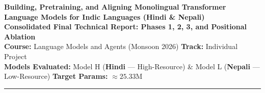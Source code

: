 \documentclass[10pt,a4paper]{article}
\begin{document}
\begin{center}
    {\Large \textbf{Building, Pretraining, and Aligning Monolingual Transformer Language Models for Indic Languages (Hindi \& Nepali)}}\\[4pt]
    {\normalsize \textbf{Consolidated Final Technical Report: Phases 1, 2, 3, and Positional Ablation}}\\[3pt]
    \small{\textbf{Course:} Language Models and Agents (Monsoon 2026) \quad \textbar \quad \textbf{Track:} Individual Project}\\[2pt]
    \footnotesize{\textbf{Models Evaluated:} Model H (\textbf{Hindi} --- High-Resource) \& Model L (\textbf{Nepali} --- Low-Resource) \quad \textbar \quad \textbf{Target Params:} $\approx 25.33\text{M}$}
\end{center}

\vspace{-6pt}
\noindent\rule{\textwidth}{0.8pt}
\vspace{-8pt}
\end{document}
